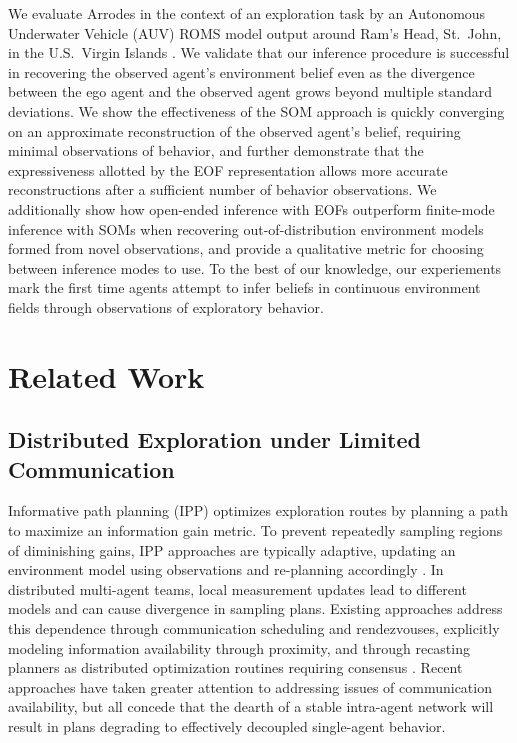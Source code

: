 \documentclass[letterpaper,10pt,conference]{ieeeconf}
\begin{document}
We evaluate Arrodes in the context of an exploration task by an Autonomous Underwater Vehicle (AUV) ROMS model output around Ram's Head, St.~John, in the U.S.~Virgin Islands \cite{zhang2025fine}. We validate that our inference procedure is successful in recovering the observed agent's environment belief even as the divergence between the ego agent and the observed agent grows beyond multiple standard deviations. We show the effectiveness of the SOM approach is quickly converging on an approximate reconstruction of the observed agent's belief, requiring minimal observations of behavior, and further demonstrate that the expressiveness allotted by the EOF representation allows more accurate reconstructions after a sufficient number of behavior observations. We additionally show how open-ended inference with EOFs outperform finite-mode inference with SOMs when recovering out-of-distribution environment models formed from novel observations, and provide a qualitative metric for choosing between inference modes to use. To the best of our knowledge, our experiements mark the first time agents attempt to infer beliefs in continuous environment fields through observations of exploratory behavior.

\section{Related Work}

\subsection{Distributed Exploration under Limited Communication}

Informative path planning (IPP) optimizes exploration routes by planning a path to maximize an information gain metric. To prevent  repeatedly sampling regions of diminishing gains, IPP approaches are typically adaptive, updating an environment model using observations and re-planning accordingly \cite{binney2010informative, hollinger2012underwater}. In distributed multi-agent teams, local measurement updates lead to different models and can cause divergence in sampling plans. Existing approaches address this dependence through communication scheduling and rendezvouses, explicitly modeling information availability through proximity, and through recasting planners as distributed optimization routines requiring consensus \cite{bramblett2023epistemic, olkin2024multi, swaminathan2024distributed}. Recent approaches have taken greater attention to addressing issues of communication availability, but all concede that the dearth of a stable intra-agent network will result in plans degrading to effectively decoupled single-agent behavior.
\end{document}
